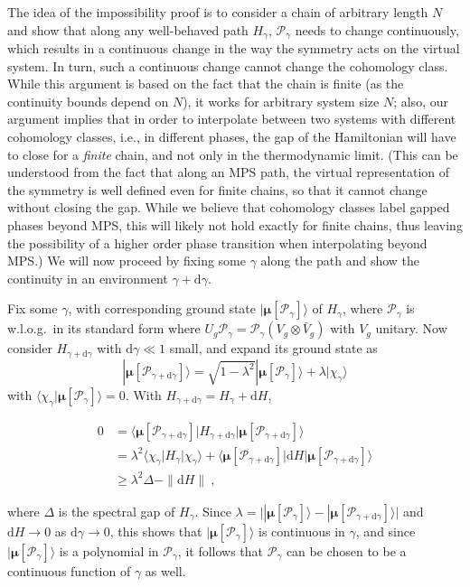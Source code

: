 \documentclass[twocolumn,superscriptaddress,prb,linenumbers]{revtex4-1}
\newcommand{\ket}[1]{\vert#1\rangle}
\newcommand{\bra}[1]{\langle#1\vert}
\newcommand{\MPS}[1]{| {\bm\mu}[#1]\rangle}
\newcommand{\mc}[1]{\mathcal{#1}}
\newcommand{\dd}{\mathrm{d}}
\begin{document}
The idea of the impossibility proof is to consider a chain of arbitrary
length $N$ and show that along any well-behaved
path $H_\gamma$, $\mc P_\gamma$ needs
to change continuously, which results in a continuous change in the way the
symmetry acts on the virtual system. In turn, such a continuous change
cannot change the cohomology class.
While this argument is based on the fact that the chain is
finite (as the continuity bounds depend on $N$), it works for arbitrary system
size $N$; also, our argument implies that in order to interpolate between
two systems with different cohomology classes, i.e., in different phases,
the gap of the Hamiltonian will have to close for a \emph{finite} chain,
and not only in the thermodynamic limit. (This can be understood from the
fact that along an MPS path, the virtual representation of the symmetry is
well defined even for finite chains, so that it cannot change without
closing the gap.  While we believe that cohomology classes label gapped
phases beyond MPS, this will likely not hold exactly for finite chains,
thus leaving the possibility of a higher order phase transition when
interpolating beyond MPS.)
We will now proceed by fixing some $\gamma$ along the path and show
the continuity in an environment $\gamma+\dd\gamma$.

Fix some $\gamma$, with corresponding ground state $\MPS{\mc
        P_{\gamma}}$ of $H_{\gamma}$, where $\mc P_{\gamma}$ is w.l.o.g.\ in
its standard form where $U_g\mc P_{\gamma}=\mc
    P_{\gamma}(V_g\otimes \bar V_g)$ with $V_g$ unitary.  Now consider
$H_{\gamma+\dd\gamma}$ with $\dd\gamma\ll1$ small, and expand its ground
state as
\[
    \MPS{\mc P_{\gamma+\dd\gamma}}=
    \sqrt{1-\lambda^2}\MPS{\mc P_\gamma}
    +\lambda \ket{\chi_\gamma}
\]
with $\langle\chi_\gamma\MPS{\mc P_\gamma}=0$.
With $H_{\gamma+\dd\gamma}=H_\gamma+\dd H$,
\begin{linenomath}
    \begin{align}
        \nonumber
        0 &= \bra{\bm\mu[\mc P_{\gamma+\dd\gamma}]}
        H_{\gamma+\dd\gamma} \MPS{\mc P_{\gamma+\dd\gamma}}
        \\
        \label{eq:inj-sym:gs-smooth}
          &= \lambda^2 \bra{\chi_\gamma}H_\gamma \ket{\chi_\gamma}
        + \bra{\bm\mu[\mc P_{\gamma+\dd\gamma}]}
        \dd H \MPS{\mc P_{\gamma+\dd\gamma}}
        \\
        \nonumber
          &\ge \lambda^2\Delta - \|\dd H\|\ ,
    \end{align}
\end{linenomath}
where $\Delta$ is the spectral gap of $H_\gamma$.
Since $\lambda=\big|\MPS{\mc P_\gamma}-\MPS{\mc P_{\gamma+ \dd\gamma}}
    \big|$ and $\dd H\rightarrow 0$ as $\dd\gamma\rightarrow 0$, this shows
that $\MPS{\mc P_\gamma}$ is continuous in $\gamma$, and since $\MPS{\mc
        P_\gamma}$ is a polynomial in $\mc P_\gamma$, it follows that $\mc
    P_\gamma$ can be chosen to be a continuous function of $\gamma$ as well.
\end{document}
